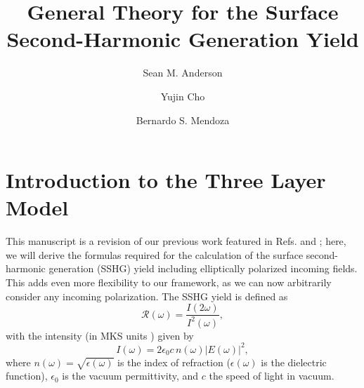 \documentclass[aps,pra,10pt,amsmath,twocolumn,letterpaper]{revtex4-1}
\begin{document}
\title{General Theory for the Surface Second-Harmonic Generation Yield}
    \author{Sean M. Anderson}
    \author{Yujin Cho}

    \author{Bernardo S. Mendoza}

\maketitle



\section{Introduction to the Three Layer Model}\label{sec:3layersshg}

This manuscript is a revision of our previous work featured in Refs.
\cite{andersonPRB16b} and \cite{andersonthesis}; here, we will derive the
formulas required for the calculation of the surface second-harmonic generation
(SSHG) yield including elliptically polarized incoming fields. This adds even
more flexibility to our framework, as we can now arbitrarily consider any
incoming polarization. The SSHG yield is defined as
\begin{equation}\label{eq:rintensities}
\mathcal{R}(\omega)=\frac{I(2\omega)}{I^2(\omega)},
\end{equation}
with the intensity (in MKS units \cite{boyd, sutherland}) given by
\begin{equation}\label{eq:intensity}
I(\omega)=
2\epsilon_{0}c\, n(\omega)|E(\omega)|^{2}
,
\end{equation}
where $n(\omega)=\sqrt{\epsilon(\omega)}$ is the index of refraction
($\epsilon(\omega)$ is the dielectric function), $\epsilon_{0}$ is the vacuum
permittivity, and $c$ the speed of light in vacuum.
\end{document}
